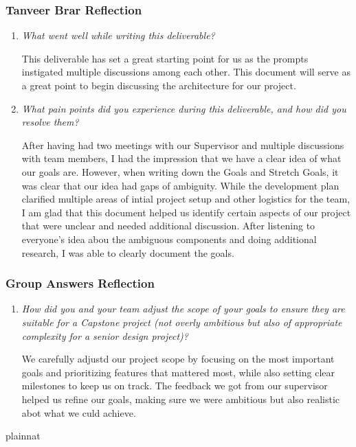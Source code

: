 \documentclass{article}
\begin{document}
\subsubsection*{Tanveer Brar Reflection}
\begin{enumerate}
  \item \textit{What went well while writing this deliverable?}

    This deliverable has set a great starting point for us as the prompts instigated multiple discussions among each other. This document will serve as a great point to begin discussing the architecture for our project.

  \item \textit{What pain points did you experience during this deliverable, and how did you resolve them?}

    After having had two meetings with our Supervisor and multiple discussions with team members, I had the impression that we have a clear idea of what our goals are. However, when writing down the Goals and Stretch Goals, it was clear that our idea had gaps of ambiguity. While the development plan clarified multiple areas of intial project setup and other logistics for the team, I am glad that this document helped us identify certain aspects of our project that were unclear and needed additional discussion. After listening to everyone's idea abou the ambiguous components and doing additional research, I was able to clearly document the goals.

\end{enumerate}

\subsubsection*{Group Answers Reflection}
\begin{enumerate}
  \item \textit{How did you and your team adjust the scope of your goals to ensure they are suitable for a Capstone project (not overly 
  ambitious but also of appropriate complexity for a senior design project)?}
  
  We carefully adjustd our project scope by focusing on the most important goals and prioritizing features that mattered most, while also 
  setting clear milestones to keep us on track. The feedback we got from our supervisor helped us refine our goals, making sure we were ambitious but
  also realistic abot what we culd achieve.
    
\end{enumerate}

 {plainnat}

\end{document}
